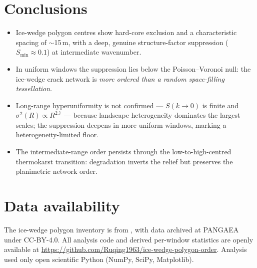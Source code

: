 \documentclass[11pt]{article}
\begin{document}
\section{Conclusions}
\begin{itemize}\setlength\itemsep{1pt}
\item Ice-wedge polygon centres show hard-core exclusion and a characteristic spacing of
$\sim$15\,m, with a deep, genuine structure-factor suppression ($S_{\min}\!\approx\!0.1$) at
intermediate wavenumber.
\item In uniform windows the suppression lies below the Poisson--Voronoi null: the ice-wedge
crack network is \emph{more ordered than a random space-filling tessellation}.
\item Long-range hyperuniformity is not confirmed --- $S(k\!\to\!0)$ is finite and
$\sigma^2(R)\!\propto\!R^{2.7}$ --- because landscape heterogeneity dominates the largest scales;
the suppression deepens in more uniform windows, marking a heterogeneity-limited floor.
\item The intermediate-range order persists through the low-to-high-centred thermokarst
transition: degradation inverts the relief but preserves the planimetric network order.
\end{itemize}

\section*{Data availability}
The ice-wedge polygon inventory is from \citet{aboltyoung2020}, with data archived at PANGAEA
\citep{aboltyoung_pangaea} under CC-BY-4.0. All analysis code and derived per-window statistics
are openly available at \url{https://github.com/Ruqing1963/ice-wedge-polygon-order}. Analysis
used only open scientific Python (NumPy, SciPy, Matplotlib).
\end{document}
